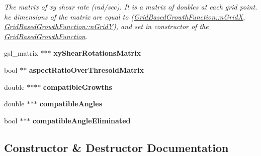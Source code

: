 \begin{DoxyCompactItemize}
\begin{DoxyCompactList}\small\item\em The matrix of xy shear rate (rad/sec). It is a matrix of doubles at each grid point. he dimensions of the matrix are equal to (\hyperlink{classGridBasedGrowthFunction_af872b9963f3a579dcd615c23bcb58a86}{Grid\+Based\+Growth\+Function\+::n\+Grid\+X}, \hyperlink{classGridBasedGrowthFunction_a625bc963a1f1e7d1f1a35dbd0ef51728}{Grid\+Based\+Growth\+Function\+::n\+Grid\+Y}), and set in constructor of the \hyperlink{classGridBasedGrowthFunction}{Grid\+Based\+Growth\+Function}. \end{DoxyCompactList}\item 
\hypertarget{classGridBasedGrowthFunction_a62e3267b367261ff2f37cee9a7c2b02b}{}gsl\+\_\+matrix $\ast$$\ast$$\ast$ {\bfseries xy\+Shear\+Rotations\+Matrix}\label{classGridBasedGrowthFunction_a62e3267b367261ff2f37cee9a7c2b02b}

\item 
\hypertarget{classGridBasedGrowthFunction_a56ff4380487e4d24881431f0e6ea6f2e}{}bool $\ast$$\ast$ {\bfseries aspect\+Ratio\+Over\+Thresold\+Matrix}\label{classGridBasedGrowthFunction_a56ff4380487e4d24881431f0e6ea6f2e}

\item 
\hypertarget{classGridBasedGrowthFunction_a59b0e127387157f89f099ae3beeaa671}{}double $\ast$$\ast$$\ast$$\ast$ {\bfseries compatible\+Growths}\label{classGridBasedGrowthFunction_a59b0e127387157f89f099ae3beeaa671}

\item 
\hypertarget{classGridBasedGrowthFunction_aac8a163bbd008d327859b488cf023c10}{}double $\ast$$\ast$$\ast$ {\bfseries compatible\+Angles}\label{classGridBasedGrowthFunction_aac8a163bbd008d327859b488cf023c10}

\item 
\hypertarget{classGridBasedGrowthFunction_addfc2d280d1fc0b0b17d7f1dfe54f873}{}bool $\ast$$\ast$$\ast$ {\bfseries compatible\+Angle\+Eliminated}\label{classGridBasedGrowthFunction_addfc2d280d1fc0b0b17d7f1dfe54f873}

\end{DoxyCompactItemize}


\subsection{Constructor \& Destructor Documentation}
\hypertarget{classGridBasedGrowthFunction_aac341fa9ccdca2d089e9f341cb68ca94}{}
